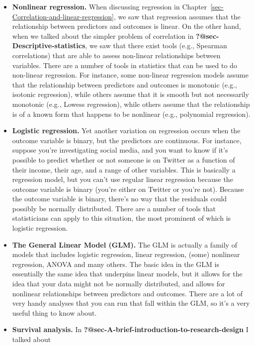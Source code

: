 \documentclass[
  a4paper,
]{book}
\begin{document}
\begin{itemize}
\item
  \textbf{Nonlinear regression.} When discussing regression in
  Chapter~\ref{sec-Correlation-and-linear-regression}, we saw that
  regression assumes that the relationship between predictors and
  outcomes is linear. On the other hand, when we talked about the
  simpler problem of correlation in
  \textbf{?@sec-Descriptive-statistics}, we saw that there exist tools
  (e.g., Spearman correlations) that are able to assess non-linear
  relationships between variables. There are a number of tools in
  statistics that can be used to do non-linear regression. For instance,
  some non-linear regression models assume that the relationship between
  predictors and outcomes is monotonic (e.g., isotonic regression),
  while others assume that it is smooth but not necessarily monotonic
  (e.g., Lowess regression), while others assume that the relationship
  is of a known form that happens to be nonlinear (e.g., polynomial
  regression).
\item
  \textbf{Logistic regression.} Yet another variation on regression
  occurs when the outcome variable is binary, but the predictors are
  continuous. For instance, suppose you're investigating social media,
  and you want to know if it's possible to predict whether or not
  someone is on Twitter as a function of their income, their age, and a
  range of other variables. This is basically a regression model, but
  you can't use regular linear regression because the outcome variable
  is binary (you're either on Twitter or you're not). Because the
  outcome variable is binary, there's no way that the residuals could
  possibly be normally distributed. There are a number of tools that
  statisticians can apply to this situation, the most prominent of which
  is logistic regression.
\item
  \textbf{The General Linear Model (GLM).} The GLM is actually a family
  of models that includes logistic regression, linear regression, (some)
  nonlinear regression, ANOVA and many others. The basic idea in the GLM
  is essentially the same idea that underpins linear models, but it
  allows for the idea that your data might not be normally distributed,
  and allows for nonlinear relationships between predictors and
  outcomes. There are a lot of very handy analyses that you can run that
  fall within the GLM, so it's a very useful thing to know about.
\item
  \textbf{Survival analysis.} In
  \textbf{?@sec-A-brief-introduction-to-research-design} I talked about

\end{itemize}
\end{document}
